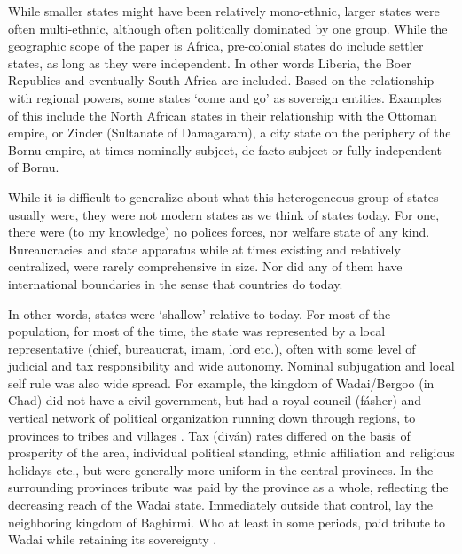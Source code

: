 \documentclass[12pt]{article}
\begin{document}
While smaller states might have been relatively mono-ethnic, larger states were
often multi-ethnic, although often politically dominated by one group. While the
geographic scope of the paper is Africa, pre-colonial states do include settler
states, as long as they were independent. In other words Liberia, the Boer
Republics and eventually South Africa are included. Based on the relationship
with regional powers, some states `come and go' as sovereign entities. Examples
of this include the North African states in their relationship with the Ottoman
empire, or Zinder (Sultanate of Damagaram), a city state on the periphery of the
Bornu empire, at times nominally subject, de facto subject or fully independent
of Bornu.

While it is difficult to generalize about what this heterogeneous group of
states usually were, they were not modern states as we think of states today.
For one, there were (to my knowledge) no polices forces, nor welfare state of
any kind. Bureaucracies and state apparatus while at times existing and
relatively centralized, were rarely comprehensive in size. Nor did any of them
have international boundaries in the sense that countries do today. 

In other words, states were `shallow' relative to today. For most of the
population, for most of the time, the state was represented by a local
representative (chief, bureaucrat, imam, lord etc.), often with some level of
judicial and tax responsibility and wide autonomy. Nominal subjugation
and local self rule was also wide spread. For example, the kingdom of
Wadai/Bergoo (in Chad) did not have a civil government, but had a royal council
(fásher) and vertical network of political organization running down through
regions, to provinces to tribes and villages \citep{barth1857travels}. Tax (diván)
rates differed on the basis of prosperity of the area, individual political
standing, ethnic affiliation and religious holidays etc., but were generally more
uniform in the central provinces. In the surrounding provinces tribute was paid
by the province as a whole, reflecting the decreasing reach of the Wadai
state. Immediately outside that control, lay the neighboring kingdom of
Baghirmi. Who at least in some periods, paid tribute to Wadai while retaining
its sovereignty \citep{barth1857travels}.
\end{document}
